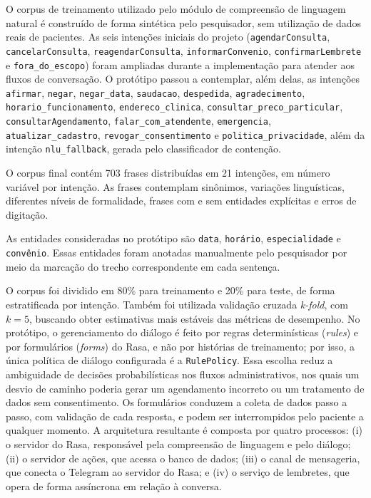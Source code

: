 \documentclass[12pt,a4paper]{extarticle}
\begin{document}
O corpus de treinamento utilizado pelo módulo de compreensão de linguagem natural é construído de forma sintética pelo pesquisador, sem utilização de dados reais de pacientes. As seis intenções iniciais do projeto (\texttt{agendarConsulta}, \texttt{cancelarConsulta}, \texttt{reagendarConsulta}, \texttt{informarConvenio}, \texttt{confirmarLembrete} e \texttt{fora\_\allowbreak{}do\_\allowbreak{}escopo}) foram ampliadas durante a implementação para atender aos fluxos de conversação. O protótipo passou a contemplar, além delas, as intenções \texttt{afirmar}, \texttt{negar}, \texttt{negar\_\allowbreak{}data}, \texttt{saudacao}, \texttt{despedida}, \texttt{agradecimento}, \texttt{horario\_\allowbreak{}funcionamento}, \texttt{endereco\_\allowbreak{}clinica}, \texttt{consultar\_\allowbreak{}preco\_\allowbreak{}particular}, \texttt{consultarAgendamento}, \texttt{falar\_\allowbreak{}com\_\allowbreak{}atendente}, \texttt{emergencia}, \texttt{atualizar\_\allowbreak{}cadastro}, \texttt{revogar\_\allowbreak{}consentimento} e \texttt{politica\_\allowbreak{}privacidade}, além da intenção \texttt{nlu\_\allowbreak{}fallback}, gerada pelo classificador de contenção.

O corpus final contém 703 frases distribuídas em 21 intenções, em número variável por intenção. As frases contemplam sinônimos, variações linguísticas, diferentes níveis de formalidade, frases com e sem entidades explícitas e erros de digitação.

As entidades consideradas no protótipo são \texttt{data}, \texttt{horário}, \texttt{especialidade} e \texttt{convênio}. Essas entidades foram anotadas manualmente pelo pesquisador por meio da marcação do trecho correspondente em cada sentença.

O corpus foi dividido em 80\% para treinamento e 20\% para teste, de forma estratificada por intenção. Também foi utilizada validação cruzada \textit{k-fold}, com $k=5$, buscando obter estimativas mais estáveis das métricas de desempenho.
\vspace{0.5em}
No protótipo, o gerenciamento do diálogo é feito por regras determinísticas (\textit{rules}) e por formulários (\textit{forms}) do Rasa, e não por histórias de treinamento; por isso, a única política de diálogo configurada é a \texttt{RulePolicy}. Essa escolha reduz a ambiguidade de decisões probabilísticas nos fluxos administrativos, nos quais um desvio de caminho poderia gerar um agendamento incorreto ou um tratamento de dados sem consentimento. Os formulários conduzem a coleta de dados passo a passo, com validação de cada resposta, e podem ser interrompidos pelo paciente a qualquer momento. A arquitetura resultante é composta por quatro processos: (i) o servidor do Rasa, responsável pela compreensão de linguagem e pelo diálogo; (ii) o servidor de ações, que acessa o banco de dados; (iii) o canal de mensageria, que conecta o Telegram ao servidor do Rasa; e (iv) o serviço de lembretes, que opera de forma assíncrona em relação à conversa.
\end{document}
